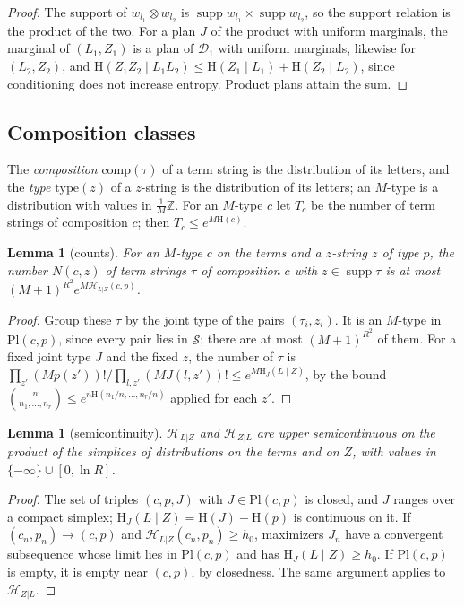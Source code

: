 \documentclass[11pt]{article}
\newtheorem{lemma}[theorem]{Lemma}
\theoremstyle{definition}
\theoremstyle{remark}
\providecommand{\Z}{\mathbb{Z}}
\newcommand{\Ent}{\mathrm{H}}                 %
\DeclareMathOperator{\supp}{supp}
\newcommand{\Sr}{\mathcal S}                 %
\newcommand{\Pl}{\mathrm{Pl}}                %
\newcommand{\Hzl}{\mathcal H_{Z|L}}          %
\newcommand{\Hlz}{\mathcal H_{L|Z}}          %
\newcommand{\cmpn}{\mathrm{comp}}            %
\newcommand{\typ}{\mathrm{type}}             %
\begin{document}
\begin{proof}
The support of $w_{l_1}\otimes w_{l_2}$ is $\supp w_{l_1}\times\supp w_{l_2}$, so the support relation is the product of the two. For a plan $J$ of the product with uniform marginals, the marginal of $(L_1,Z_1)$ is a plan of $\mathcal D_1$ with uniform marginals, likewise for $(L_2,Z_2)$, and $\Ent(Z_1Z_2\mid L_1L_2)\le\Ent(Z_1\mid L_1)+\Ent(Z_2\mid L_2)$, since conditioning does not increase entropy. Product plans attain the sum.
\end{proof}

\subsection{Composition classes}\label{cp:sec:tr:G}

The \emph{composition} $\cmpn(\tau)$ of a term string is the distribution of its letters, and the \emph{type} $\typ(z)$ of a $z$-string is the distribution of its letters; an $M$-type is a distribution with values in $\frac1M\Z$. For an $M$-type $c$ let $T_c$ be the number of term strings of composition $c$; then $T_c\le e^{M\Ent(c)}$.

\begin{lemma}[counts]\label{cp:C9:count}
For an $M$-type $c$ on the terms and a $z$-string $z$ of type $p$, the number $N(c,z)$ of term strings $\tau$ of composition $c$ with $z\in\supp\tau$ is at most $(M+1)^{R^2}e^{M\Hlz(c,p)}$.
\end{lemma}

\begin{proof}
Group these $\tau$ by the joint type of the pairs $(\tau_i,z_i)$. It is an $M$-type in $\Pl(c,p)$, since every pair lies in $\Sr$; there are at most $(M+1)^{R^2}$ of them. For a fixed joint type $J$ and the fixed $z$, the number of $\tau$ is $\prod_{z'}(Mp(z'))!/\prod_{l,z'}(MJ(l,z'))!\le e^{M\Ent_J(L\mid Z)}$, by the bound $\binom{n}{n_1,\dots,n_r}\le e^{n\Ent(n_1/n,\dots,n_r/n)}$ applied for each $z'$.
\end{proof}

\begin{lemma}[semicontinuity]\label{cp:C9:usc}
$\Hlz$ and $\Hzl$ are upper semicontinuous on the product of the simplices of distributions on the terms and on $Z$, with values in $\{-\infty\}\cup[0,\ln R]$.
\end{lemma}

\begin{proof}
The set of triples $(c,p,J)$ with $J\in\Pl(c,p)$ is closed, and $J$ ranges over a compact simplex; $\Ent_J(L\mid Z)=\Ent(J)-\Ent(p)$ is continuous on it. If $(c_n,p_n)\to(c,p)$ and $\Hlz(c_n,p_n)\ge h_0$, maximizers $J_n$ have a convergent subsequence whose limit lies in $\Pl(c,p)$ and has $\Ent_J(L\mid Z)\ge h_0$. If $\Pl(c,p)$ is empty, it is empty near $(c,p)$, by closedness. The same argument applies to $\Hzl$.
\end{proof}
\end{document}
